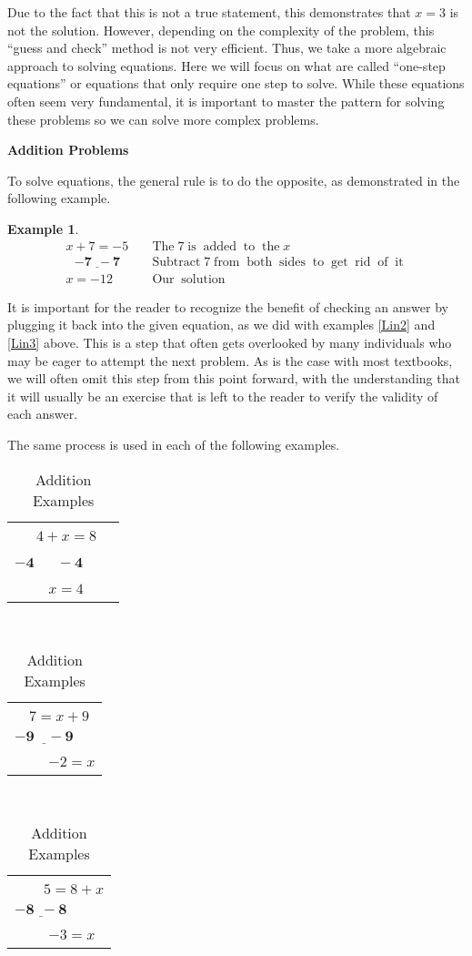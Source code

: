 \documentclass[12pt]{book}
\theoremstyle{definition}
\newtheorem{example}{Example}
\newcommand{\tmmathbf}[1]{\ensuremath{\boldsymbol{#1}}}
\newcommand{\tmop}[1]{\ensuremath{\operatorname{#1}}}
\begin{document}
Due to the fact that this is not a true statement, this demonstrates that $x=3$ is not the solution. However, depending on the complexity of the problem, this ``guess and check'' method is not very efficient. Thus, we take a more algebraic approach to solving equations. Here we will focus on what are called ``one-step equations'' or equations that only require one step to solve. While these equations often seem very fundamental, it is important to master the pattern for solving these problems so we can solve more complex problems.\par
{\bf Addition Problems}\par
To solve equations, the general rule is to do the opposite, as demonstrated in the following example.
\begin{example}\label{Lin4}
\begin{eqnarray*}
  x + 7 = - 5 &  & \tmop{The} 7 \tmop{is} \tmop{added} \tmop{to} \tmop{the}
  x\\
  ~~~\underline{\tmmathbf{- 7 ~~- 7}} &  & \tmop{Subtract} 7 \tmop{from}
  \tmop{both} \tmop{sides} \tmop{to} \tmop{get} \tmop{rid} \tmop{of}
  \tmop{it}\\
  x = - 12 &  & \tmop{Our} \tmop{solution}
\end{eqnarray*}
\end{example}
It is important for the reader to recognize the benefit of checking an answer by plugging it back into the given equation, as we did with examples \ref{Lin2} and \ref{Lin3} above.  This is a step that often gets overlooked by many individuals who may be eager to attempt the next problem.  As is the case with most textbooks, we will often omit this step from this point forward, with the understanding that it will usually be an exercise that is left to the reader to verify the validity of each answer.\par
The same process is used in each of the following examples.
	\begin{table}[h]
		\begin{tabular}{l}
    ~~~$4 + x = 8$\\
    \underline{$\ensuremath{\boldsymbol{- 4 ~~~~~~~- 4}}$}~~~~\\
    ~~~~ $x = 4$
  \end{tabular} \ \ \ \ \ \ \ \ \ \ \ \ \ \ \ \ \ \ \ \begin{tabular}{l}
    \ \ $7 = x + 9$\\
    $\tmmathbf{\underline{- 9 ~~~~- 9}}$\\
    ~~~~ $- 2 = x$
  \end{tabular} \ \ \ \ \ \ \ \ \ \ \ \ \ \ \ \ \ \ \ \begin{tabular}{l}
    \ \ ~~$5 = 8 + x$\\
    $\tmmathbf{\underline{- 8 ~~- 8}}$\\
    ~~~~ $- 3 = x$
  \end{tabular}
  \caption{Addition Examples}
	\end{table}
\end{document}
